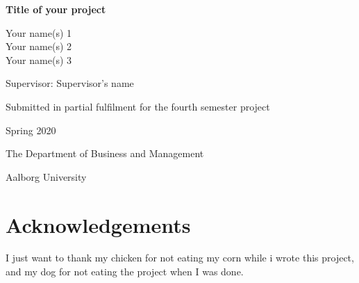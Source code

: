 \documentclass[10pt,twoside]{article}
\title{}
\author{}
\date{}
\begin{document}

\begin{centering}

\vspace{2 cm}

\Large

{\bf Title of your project}

\vspace{2 cm}

\Large
Your name(s) 1\\
Your name(s) 2\\
Your name(s) 3

\vspace{2 cm}

\normalsize
Supervisor: Supervisor's name

\vspace{2 cm}

\normalsize
Submitted in partial fulfilment for the fourth semester project

Spring 2020

\vspace{2 cm}

\normalsize
The Department of Business and Management

\normalsize
Aalborg University

\end{centering}

\newpage

\pagestyle{fancy}

\fancyhead[LE,RO]{}
\fancyhead[LO,RE]{}

\renewcommand{\headrulewidth}{0.4pt}
\renewcommand{\footrulewidth}{0pt}


\FloatBarrier
\newpage

\section*{Acknowledgements}

I just want to thank my chicken for not eating my corn while i wrote
this project, and my dog for not eating the project when I was done.

\FloatBarrier
\cleardoublepage


\setcounter{tocdepth}{2}

\tableofcontents
{}
\end{document}
